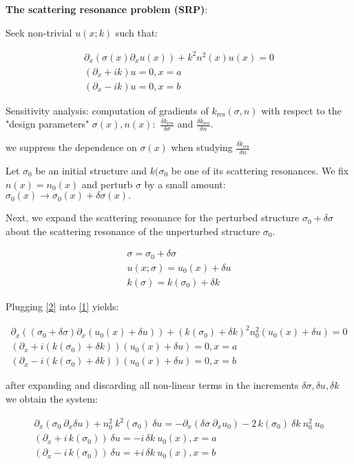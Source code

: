 \textbf{The scattering resonance problem (SRP)}:

Seek non-trivial $u(x;k)$ such that:

\begin{align}
    \partial_x (\sigma(x) \partial_x u(x)) + k^2 n^2(x)u(x) = 0 \label{1}\\
    (\partial_x + ik)u =0, x=a \nonumber\\
    (\partial_x - ik)u =0, x=b \nonumber
\end{align}

Sensitivity analysis: computation of gradients of $k_\mathrm{res}(\sigma,n)$ with respect to the "design parameters" $\sigma(x),n(x):$ $\frac{\delta k_\text{res}}{\delta \sigma}$ and $\frac{\delta k_\mathrm{res}}{\delta n}$.

we suppress the dependence on $\sigma(x)$ when studying $\frac{\delta k_\mathrm{res}}{\delta n}$

Let $\sigma_0$ be an initial structure and $k(\sigma_0$ be one of its scattering resonances. We fix $n(x) = n_0(x)$ and perturb $\sigma$ by a small amount:
$\sigma_0(x) 	\longrightarrow \sigma_0(x) + \delta \sigma(x).$

Next, we expand the scattering resonance for the perturbed structure $\sigma_0 + \delta \sigma$ about the scattering resonance of the unperturbed structure $\sigma_0$.

\begin{align}\label{2}
    \sigma = \sigma_0 + \delta \sigma \nonumber\\
    u(x;\sigma) = u_0(x) + \delta u\\
    k(\sigma) = k(\sigma_0) + \delta k 
\end{align}

Plugging \eqref{2} into \eqref{1} yields:

\begin{align}
    \partial_x ((\sigma_0 + \delta \sigma) \partial_x (u_0(x) + \delta u)) + (k(\sigma_0) + \delta k)^2 n_0^2(u_0(x) + \delta u) = 0 \\
    (\partial_x + i(k(\sigma_0) + \delta k))(u_0(x) + \delta u) =0, x=a \nonumber\\
    (\partial_x - i(k(\sigma_0) + \delta k))(u_0(x) + \delta u) =0, x=b \nonumber
\end{align}

after expanding and discarding all non-linear terms in the increments $\delta \sigma,\delta u,\delta k$ we obtain the system:

\begin{align}
    \partial_x (\sigma_0 \: \partial_x \delta u) + n_0^2 \: k^2(\sigma_0) \: \delta u = - \partial_x(\delta \sigma \: \partial_x u_0) - 2 \, k(\sigma_0) \: \delta k \: n_0^2 \: u_0\label{3}\\
    (\partial_x + i \, k(\sigma_0)) \: \delta u = -i\, \delta k \: u_0(x) , x=a \nonumber\\
    (\partial_x - i \, k(\sigma_0)) \: \delta u = +i\, \delta k \: u_0(x), x=b \nonumber
\end{align}

